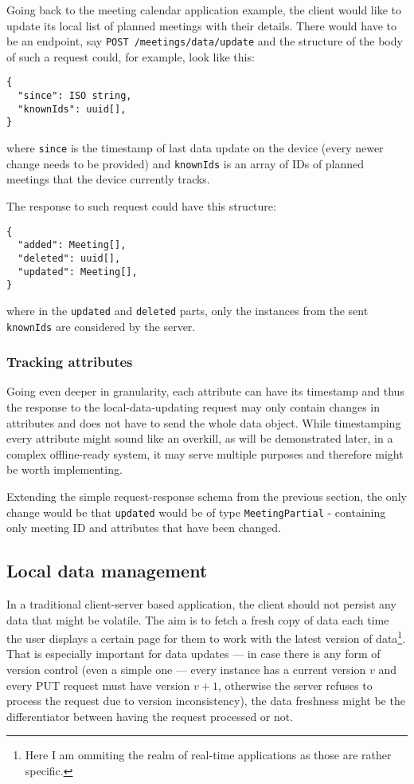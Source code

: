 \documentclass[
  digital,     %
  color,       %
  oneside,     %
  nosansbold,  %
  nocolorbold, %
  lof,         %
  lot,         %
]{fithesis4}
\begin{document}
Going back to the meeting calendar application example, the client would like to update its local list of planned meetings with their details. There would have to be an endpoint, say \texttt{POST /meetings/data/update} and the structure of the body of such a request could, for example, look like this: 

\begin{lstlisting}
{
  "since": ISO string,
  "knownIds": uuid[],
}

\end{lstlisting}
where \texttt{since} is the timestamp of last data update on the device (every newer change needs to be provided) and \texttt{knownIds} is an array of IDs of planned meetings that the device currently tracks.

The response to such request could have this structure:
\begin{lstlisting}
{
  "added": Meeting[],
  "deleted": uuid[],
  "updated": Meeting[],
}

\end{lstlisting}

where in the \texttt{updated} and \texttt{deleted} parts, only the instances from the sent \texttt{knownIds} are considered by the server.

\subsubsection{Tracking attributes}
Going even deeper in granularity, each attribute can have its timestamp and thus the response to the local-data-updating request may only contain changes in attributes and does not have to send the whole data object. While timestamping every attribute might sound like an overkill, as will be demonstrated later, in a complex offline-ready system, it may serve multiple purposes and therefore might be worth implementing.

Extending the simple request-response schema from the previous section, the only change would be that \texttt{updated} would be of type \texttt{MeetingPartial} - containing only meeting ID and attributes that have been changed.

\subsection{Local data management}
In a traditional client-server based application, the client should not persist any data that might be volatile. The aim is to fetch a fresh copy of data each time the user displays a certain page for them to work with the latest version of data\footnote{Here I am ommiting the realm of real-time applications as those are rather specific.}. That is especially important for data updates --- in case there is any form of version control (even a simple one --- every instance has a current version $v$ and every PUT request must have version $v + 1$, otherwise the server refuses to process the request due to version inconsistency), the data freshness might be the differentiator between having the request processed or not. 
\end{document}

